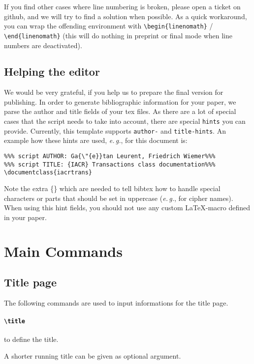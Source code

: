 \documentclass{iacrtrans}
\begin{document}
If you find other cases where line numbering is broken, please open a
ticket on github, and we will try to find a solution when possible.
As a quick workaround, you can wrap the offending environment with
\verb+\begin{linenomath}+ / \verb+\end{linenomath}+ (this will do
nothing in preprint or final mode when line numbers are deactivated).

\subsection{Helping the editor}

We would be very grateful, if you help us to prepare the final version for publishing.
In order to generate bibliographic information for your paper, we parse the author and title fields of your tex files.
As there are a lot of special cases that the script needs to take into account, there are special \texttt{hints} you can provide.
Currently, this template supports \texttt{author-} and \texttt{title-hints}.
An example how these hints are used, \emph{e.\,g.}, for this document is:
\begin{verbatim}
%%% script AUTHOR: Ga{\"{e}}tan Leurent, Friedrich Wiemer%%%
%%% script TITLE: {IACR} Transactions class documentation%%%
\documentclass{iacrtrans}
\end{verbatim}
Note the extra \{\} which are needed to tell bibtex how to handle special characters or parts that should be set in uppercase (\emph{e.\,g.}, for cipher names).
When using this hint fields, you should not use any custom \LaTeX-macro defined in your paper.

\section{Main Commands}

\subsection{Title page}

The following commands are used to input informations for the title page.

\paragraph{\texttt{\textbackslash title}} to define the title.

A shorter running title can be given as optional argument.
\end{document}
